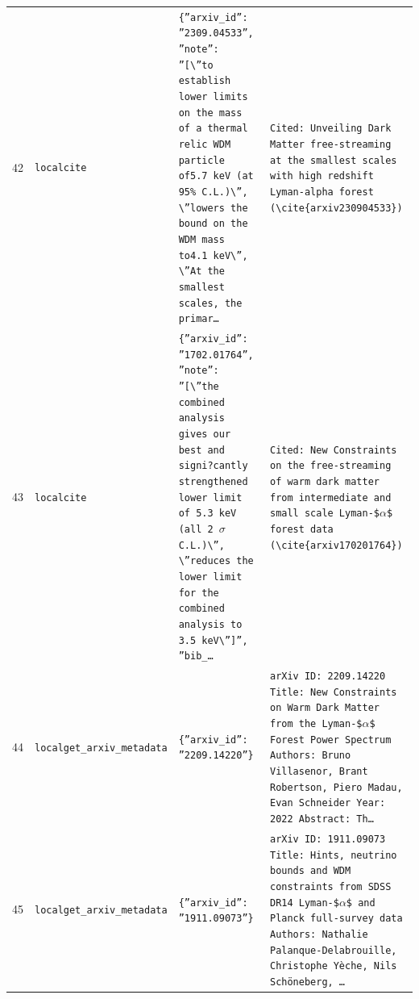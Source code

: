 \documentclass[11pt,a4paper]{article}
\begin{document}
\begin{longtable}{@{}p{}p{}p{}p{}@{}}
42 & \texttt{local}\newline\texttt{cite} & \texttt{\{''arxiv\_\allowbreak{}id'':\allowbreak{} ''2309.04533'',\allowbreak{} ''note'':\allowbreak{} ''[\textbackslash{}\allowbreak{}''to establish lower limits on the mass of a thermal relic WDM particle of5.7 keV (at 95\% C.L.)\allowbreak{}\textbackslash{}\allowbreak{}'',\allowbreak{} \textbackslash{}\allowbreak{}''lowers the bound on the WDM mass to4.1 keV\textbackslash{}\allowbreak{}'',\allowbreak{} \textbackslash{}\allowbreak{}''At the smallest scales,\allowbreak{} the primar\ldots{}\allowbreak{}} & \texttt{Cited:\allowbreak{} Unveiling Dark Matter free-streaming at the smallest scales with high redshift Lyman-alpha forest (\textbackslash{}\allowbreak{}cite\{arxiv230904533\}\allowbreak{})\allowbreak{}} \\
43 & \texttt{local}\newline\texttt{cite} & \texttt{\{''arxiv\_\allowbreak{}id'':\allowbreak{} ''1702.01764'',\allowbreak{} ''note'':\allowbreak{} ''[\textbackslash{}\allowbreak{}''the combined analysis gives our best and signi?cantly strengthened lower limit of 5.3 keV (all 2 $\sigma$ C.L.)\allowbreak{}\textbackslash{}\allowbreak{}'',\allowbreak{} \textbackslash{}\allowbreak{}''reduces the lower limit for the combined analysis to 3.5 keV\textbackslash{}\allowbreak{}'']\allowbreak{}'',\allowbreak{} ''bib\_\allowbreak{}\ldots{}\allowbreak{}} & \texttt{Cited:\allowbreak{} New Constraints on the free-streaming of warm dark matter from intermediate and small scale Lyman-\$$\alpha$\$ forest data (\textbackslash{}\allowbreak{}cite\{arxiv170201764\}\allowbreak{})\allowbreak{}} \\
44 & \texttt{local}\newline\texttt{get\_\allowbreak{}arxiv\_\allowbreak{}metadata} & \texttt{\{''arxiv\_\allowbreak{}id'':\allowbreak{} ''2209.14220''\}\allowbreak{}} & \texttt{arXiv ID:\allowbreak{} 2209.14220 Title:\allowbreak{} New Constraints on Warm Dark Matter from the Lyman-\$$\alpha$\$ Forest Power Spectrum Authors:\allowbreak{} Bruno Villasenor,\allowbreak{} Brant Robertson,\allowbreak{} Piero Madau,\allowbreak{} Evan Schneider Year:\allowbreak{} 2022 Abstract:\allowbreak{} Th\ldots{}\allowbreak{}} \\
45 & \texttt{local}\newline\texttt{get\_\allowbreak{}arxiv\_\allowbreak{}metadata} & \texttt{\{''arxiv\_\allowbreak{}id'':\allowbreak{} ''1911.09073''\}\allowbreak{}} & \texttt{arXiv ID:\allowbreak{} 1911.09073 Title:\allowbreak{} Hints,\allowbreak{} neutrino bounds and WDM constraints from SDSS DR14 Lyman-\$$\alpha$\$ and Planck full-survey data Authors:\allowbreak{} Nathalie Palanque-Delabrouille,\allowbreak{} Christophe Yèche,\allowbreak{} Nils Schöneberg,\allowbreak{} \ldots{}\allowbreak{}} \\

\end{longtable}
\end{document}
